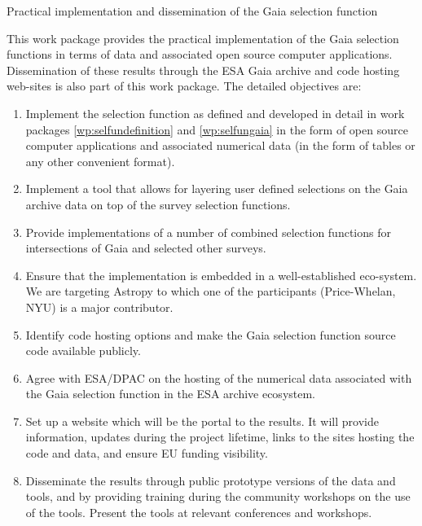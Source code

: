\begin{workpackage}{Practical implementation and dissemination of the Gaia selection function}
  \label{wp:selfunimplementation}
  \wpend{\duration} %
 
  \makewptable %

  \begin{wpobjectives}
    This work package provides the practical implementation of the Gaia selection functions in terms of data and associated open source computer applications. Dissemination of these results through the ESA Gaia archive and code hosting web-sites is also part of this work package. The detailed objectives are:
    \begin{enumerate}
      \item Implement the selection function as defined and developed in detail in work packages \ref{wp:selfundefinition} and \ref{wp:selfungaia} in the form of open source computer applications and associated numerical data (in the form of tables or any other convenient format).
      \item Implement a tool that allows for layering user defined selections on the Gaia archive data on top of the survey selection functions.
      \item Provide implementations of a number of combined selection functions for intersections of Gaia and selected other surveys.
      \item Ensure that the implementation is embedded in a well-established eco-system. We are targeting Astropy to which one of the participants (Price-Whelan, NYU) is a major contributor.
      \item Identify code hosting options and make the Gaia selection function source code available publicly.
      \item Agree with ESA/DPAC on the hosting of the numerical data associated with the Gaia selection function in the ESA archive ecosystem.
      \item Set up a website which will be the portal to the {\acro} results. It will provide information, updates during the project lifetime, links to the sites hosting the code and data, and ensure EU funding visibility.
      \item Disseminate the results through public prototype versions of the {\acro} data and tools, and by providing training during the community workshops on the use of the tools. Present the {\acro} tools at relevant conferences and workshops.
    \end{enumerate}
  \end{wpobjectives}


\end{workpackage}
